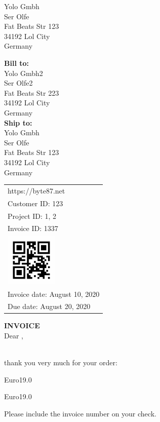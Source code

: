 \documentclass[a4paper]{letter}
\makeatletter
\renewcommand*{\opening}[1]{\ifx\@empty\fromaddress%
  \thispagestyle{firstpage}%
    {\raggedleft\@date\par}%
  \else%
   \thispagestyle{empty}%
   {%
    \begin{minipage}[c]{0.50\linewidth}
    \textbf{Bill to:}\\
Yolo Gmbh2\\Ser Olfe2\\Fat Beats Str 223\\34192 Lol City\\Germany\\[0.5em]%
    \textbf{Ship to:}\\[0.1em]%
Yolo Gmbh\\Ser Olfe\\Fat Beats Str 123\\34192 Lol City\\Germany\\[0.5em]%
    \end{minipage}
    \begin{minipage}[c]{0.45\linewidth}
    \raggedleft\begin{tabular}{l@{}}\ignorespaces
    https://byte87.net\\%
    Customer ID: 123\\%
    Project  ID: 1, 2\\%
    Invoice ID: 1337\\%
    \includegraphics[height=2.5cm, keepaspectratio=true]{qr.png}\\[0.2em]%
    Invoice date: August 10, 2020\\
    Due date: August 20, 2020\\
    \end{tabular}
    \end{minipage}
    \par
}%
  \fi
  \vspace{2\parskip}%
  #1\par\nobreak}
\makeatother
\begin{document}
%
    \begin{letter}{%
Yolo Gmbh\\Ser Olfe\\Fat Beats Str 123\\34192 Lol City\\Germany
}%
%
\opening{{\large \bf INVOICE} \\[1.0cm] Dear \toname{},}\hfil\\%
thank you very much for your order: %
\begin{invoice}{Euro}{19.0}
%
%
%
\end{invoice}%
\begin{invoice}{Euro}{19.0}
%
%
%
\end{invoice}%
Please include the invoice number on your check. %
\end{letter}%
\end{document}
